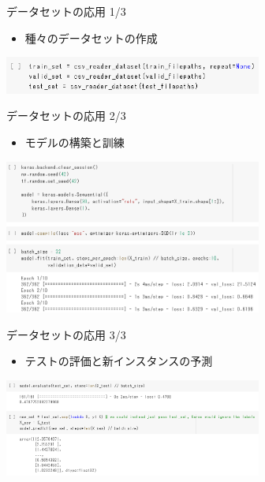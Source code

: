 \documentclass[aspectratio=169, dvipdfmx, 14pt, xcolor={svgnames,dvipsnames}, t]{beamer}
\begin{document}

\begin{frame}{データセットの応用 1/3}

  \begin{itemize}
    \tightlist
    \item
          種々のデータセットの作成
  \end{itemize}

  \centering
  \includegraphics[width=240pt]{img/hands-on-ml_13-1-6_1.png}

\end{frame}


\begin{frame}{データセットの応用 2/3}

  \begin{itemize}
    \tightlist
    \item
          モデルの構築と訓練
  \end{itemize}

  \centering
  \includegraphics[width=240pt]{img/hands-on-ml_13-1-6_2.png}

\end{frame}


\begin{frame}{データセットの応用 3/3}

  \begin{itemize}
    \tightlist
    \item
          テストの評価と新インスタンスの予測
  \end{itemize}

  \centering
  \includegraphics[width=240pt]{img/hands-on-ml_13-1-6_3.png}

\end{frame}
\end{document}
